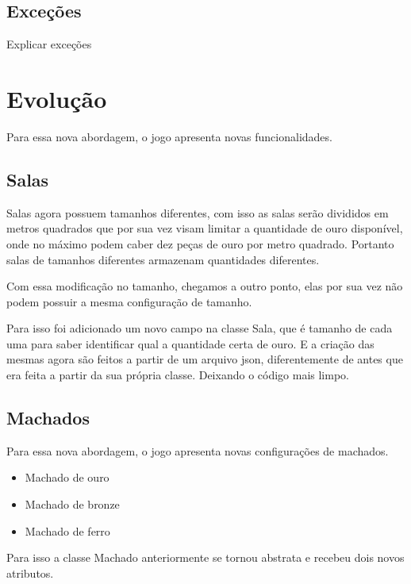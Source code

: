 \documentclass[runningheads,a4paper]{llncs}
\begin{document}
\subsection{Exceções}

Explicar exceções

\subsection{}

\section{Evolução}
	Para essa nova abordagem, o jogo apresenta novas funcionalidades.
	
	\subsection{Salas}
		Salas agora possuem tamanhos diferentes, com isso as salas serão divididos em metros quadrados que por sua vez visam limitar a quantidade de ouro disponível, onde no máximo podem caber dez peças de ouro por metro quadrado. Portanto salas de tamanhos diferentes armazenam quantidades diferentes.
		
		Com essa modificação no tamanho, chegamos a outro ponto, elas por sua vez não podem possuir a mesma configuração de tamanho.
		
		Para isso foi adicionado um novo campo na classe Sala, que é tamanho de cada uma para saber identificar qual a quantidade certa de ouro. E a criação das mesmas agora são feitos a partir de um arquivo json, diferentemente de antes que era feita a partir da sua própria classe. Deixando o código mais limpo.
		
	
	\subsection{Machados}
		Para essa nova abordagem, o jogo apresenta novas configurações de machados.
		\begin{itemize}
			\item Machado de ouro
			\item Machado de bronze
			\item Machado de ferro
		\end{itemize}
		
		Para isso a classe Machado anteriormente se tornou abstrata e recebeu dois novos atributos. 
		
\end{document}
